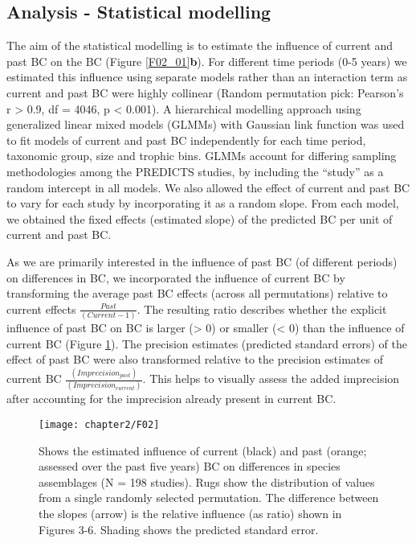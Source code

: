 \subsection{Analysis - Statistical modelling}
\label{C02_0205}
The aim of the statistical modelling is to estimate the influence of current and past BC on the BC (Figure \ref{F02_01}\textbf{b}). For different time periods (0-5 years) we estimated this influence using separate models rather than an interaction term as current and past BC were highly collinear (Random permutation pick: Pearson’s r > 0.9, df = 4046, p < 0.001). A hierarchical modelling approach using generalized linear mixed models (GLMMs) with Gaussian link function was used to fit models of current and past BC independently for each time period, taxonomic group, size and trophic bins. GLMMs account for differing sampling methodologies among the PREDICTS studies, by including the “study” as a random intercept in all models. We also allowed the effect of current and past BC to vary for each study by incorporating it as a random slope. From each model, we obtained the fixed effects (estimated slope) of the predicted BC per unit of current and past BC.
	
As we are primarily interested in the influence of past BC (of different periods) on differences in BC, we incorporated the influence of current BC by transforming the average past BC effects (across all permutations) relative to current effects $\frac{Past}{(Current - 1)}$. The resulting ratio describes whether the explicit influence of past BC on BC is larger (> 0) or smaller (< 0) than the influence of current BC (Figure \ref{F02_02}). The precision estimates (predicted standard errors) of the effect of past BC were also transformed relative to the precision estimates of current BC $\frac{(Imprecision_{past})}{(Imprecision_{current})}$. This helps to visually assess the added imprecision after accounting for the imprecision already present in current BC. 

\begin{figure}[ht]
\centering
\texttt{[image: chapter2/F02]}
\caption{Shows the estimated influence of current (black) and past (orange; assessed over the past five years) BC on differences in species assemblages (N = 198 studies). Rugs show the distribution of values from a single randomly selected permutation. The difference between the slopes (arrow) is the relative influence (as ratio) shown in Figures 3-6. Shading shows the predicted standard error.}
\label{F02_02}
\end{figure}

